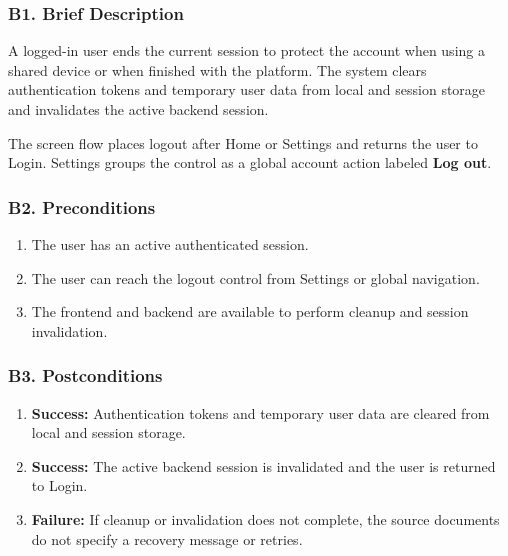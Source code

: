 \documentclass[12pt]{article}
\begin{document}
\hypertarget{sec:b1-brief-description}{}
\subsubsection*{B1. Brief Description}
\par\medskip

A logged-in user ends the current session to protect the account when using a shared device or when finished with the platform. The system clears authentication tokens and temporary user data from local and session storage and invalidates the active backend session.
\par\medskip

The screen flow places logout after Home or Settings and returns the user to Login. Settings groups the control as a global account action labeled \textbf{Log out}.
\par\medskip

\hypertarget{sec:b2-preconditions}{}
\subsubsection*{B2. Preconditions}
\par\medskip

\begin{enumerate}
\item The user has an active authenticated session.
\item The user can reach the logout control from Settings or global navigation.
\item The frontend and backend are available to perform cleanup and session invalidation.
\end{enumerate}
\par\medskip

\hypertarget{sec:b3-postconditions}{}
\subsubsection*{B3. Postconditions}
\par\medskip

\begin{enumerate}
\item \textbf{Success:} Authentication tokens and temporary user data are cleared from local and session storage.
\item \textbf{Success:} The active backend session is invalidated and the user is returned to Login.
\item \textbf{Failure:} If cleanup or invalidation does not complete, the source documents do not specify a recovery message or retries.
\end{enumerate}
\par\medskip
\end{document}
